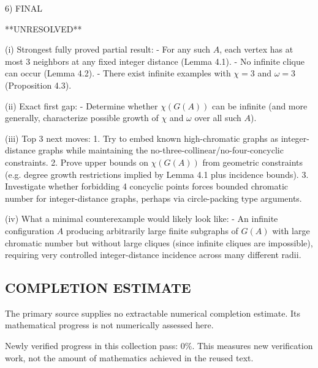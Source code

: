 6) FINAL

**UNRESOLVED**

(i) Strongest fully proved partial result:
- For any such $A$, each vertex has at most 3 neighbors at any fixed integer distance (Lemma 4.1).
- No infinite clique can occur (Lemma 4.2).
- There exist infinite examples with $\chi=3$ and $\omega=3$ (Proposition 4.3).

(ii) Exact first gap:
- Determine whether $\chi(G(A))$ can be infinite (and more generally, characterize possible growth of $\chi$ and $\omega$ over all such $A$).

(iii) Top 3 next moves:
1. Try to embed known high-chromatic graphs as integer-distance graphs while maintaining the no-three-collinear/no-four-concyclic constraints.
2. Prove upper bounds on $\chi(G(A))$ from geometric constraints (e.g. degree growth restrictions implied by Lemma 4.1 plus incidence bounds).
3. Investigate whether forbidding 4 concyclic points forces bounded chromatic number for integer-distance graphs, perhaps via circle-packing type arguments.

(iv) What a minimal counterexample would likely look like:
- An infinite configuration $A$ producing arbitrarily large finite subgraphs of $G(A)$ with large chromatic number but without large cliques (since infinite cliques are impossible), requiring very controlled integer-distance incidence across many different radii.




\subsection*{COMPLETION ESTIMATE}
The primary source supplies no extractable numerical completion estimate. Its mathematical progress is not numerically assessed here.

Newly verified progress in this collection pass: $0\%$. This measures new verification work, not the amount of mathematics achieved in the reused text.

